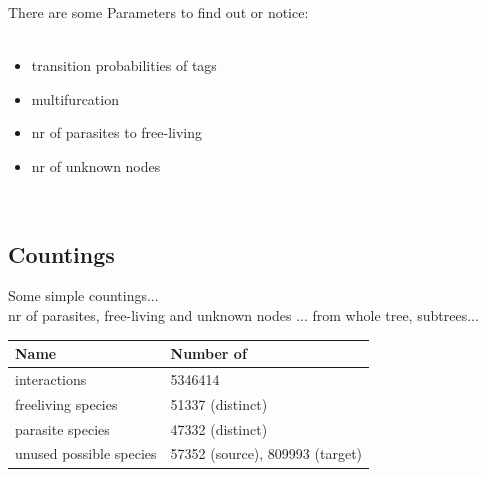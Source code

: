     There are some Parameters to find out or notice: \\
     \\
    \begin{itemize}
      \item transition probabilities of tags
      \item multifurcation
      \item nr of parasites to free-living
      \item nr of unknown nodes 
    \end{itemize}
     \\

    \subsection{Countings}
      Some simple countings...\\
      nr of parasites, free-living and unknown nodes ... from whole tree, subtrees...
      \begin{center}
        \begin{tabular}{ | l | p{3cm} | }
          \hline
          Name & Number of \\
          \hline \hline
          interactions & 5346414 \\ \hline
          freeliving species & 51337 (distinct) \\ \hline
          parasite species &  47332 (distinct) \\ \hline
          unused possible species & 57352 (source), 809993 (target) \\
          \hline  
        \end{tabular}
      \end{center}

